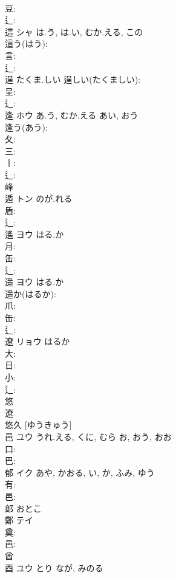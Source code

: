 \documentclass[8pt]{extreport}
\begin{document}
\begin{CJK}{UTF8}{min}
\\	豆: 
\\	辶: 
\\	這	シャ	は.う, は.い, むか.える, この		
\\	這う(はう): 
\\	言: 
\\	辶: 
\\	逞		たくま.しい			逞しい(たくましい): 
\\	呈: 
\\	辶: 
\\	逢	ホウ	あ.う, むか.える	あい, おう	
\\	逢う(あう): 
\\	夂: 
\\	三: 
\\	丨: 
\\	辶: 
\\	峰 
\\	遁	トン	のが.れる		
\\	盾: 
\\	辶: 
\\	遙	ヨウ	はる.か		
\\	月: 
\\	缶: 
\\	辶: 
\\	遥	ヨウ	はる.か		
\\	遥か(はるか): 
\\	爪: 
\\	缶: 
\\	辶: 
\\	遼	リョウ		はるか	
\\	大: 
\\	日: 
\\	小: 
\\	辶: 
\\	悠 
\\	遼 
\\	悠久 [ゆうきゅう] 
\\	邑	ユウ	うれ.える, くに, むら	お, おう, おお	
\\	口: 
\\	巴: 
\\	郁	イク		あや, かおる, い, か, ふみ, ゆう	
\\	有: 
\\	邑: 
\\	郞		おとこ				
\\	鄭	テイ			
\\	奠: 
\\	邑: 
\\	酋 
\\	酉	ユウ	とり	なが, みのる	

\end{CJK}
\end{document}

